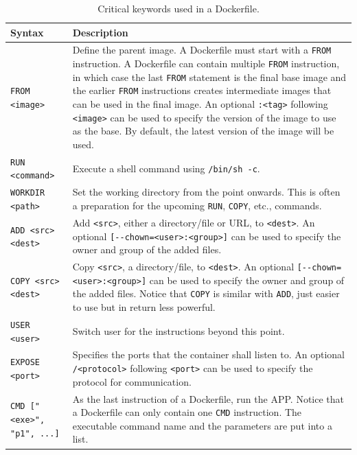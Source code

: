 \begin{table}
	\centering \caption{Critical keywords used in a Dockerfile.}\label{ch:vac:tab:keywordsdockerfile}
	\begin{tabularx}{\textwidth}{lX}
		\hline
		Syntax & Description \\ \hline
		\verb|FROM <image>| & Define the parent image. A Dockerfile must start with a \verb|FROM| instruction. A Dockerfile can contain multiple \verb|FROM| instruction, in which case the last \verb|FROM| statement is the final base image and the earlier \verb|FROM| instructions creates intermediate images that can be used in the final image. An optional \verb|:<tag>| following \verb|<image>| can be used to specify the version of the image to use as the base. By default, the latest version of the image will be used. \\ \hdashline
		\verb|RUN <command>| & Execute a shell command using \verb|/bin/sh -c|. \\ \hdashline
		\verb|WORKDIR <path>| & Set the working directory from the point onwards. This is often a preparation for the upcoming \verb|RUN|, \verb|COPY|, etc., commands. \\ \hdashline
		\verb|ADD <src> <dest>| & Add \verb|<src>|, either a directory/file or URL, to \verb|<dest>|. An optional \verb|[--chown=<user>:<group>]| can be used to specify the owner and group of the added files. \\ \hdashline
		\verb|COPY <src> <dest>| & Copy \verb|<src>|, a directory/file, to \verb|<dest>|. An optional \verb|[--chown=<user>:<group>]| can be used to specify the owner and group of the added files. Notice that \verb|COPY| is similar with \verb|ADD|, just easier to use but in return less powerful. \\ \hdashline
		\verb|USER <user>| & Switch user for the instructions beyond this point. \\ \hdashline
		\verb|EXPOSE <port>| & Specifies the ports that the container shall listen to. An optional \verb|/<protocol>| following \verb|<port>| can be used to specify the protocol for communication. \\ \hdashline
		\verb|CMD ["<exe>", "p1", ...]| & As the last instruction of a Dockerfile, run the APP. Notice that a Dockerfile can only contain one \verb|CMD| instruction. The executable command name and the parameters are put into a list. \\
		\hline
	\end{tabularx}
\end{table}

